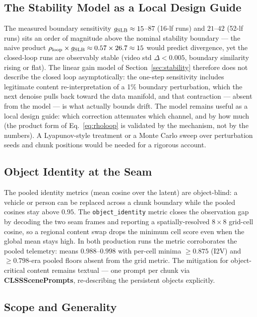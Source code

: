 \documentclass[12pt]{article}
\begin{document}
\subsection{The Stability Model as a Local Design Guide}
\label{sec:stabdisc}
The measured boundary sensitivity $g_{\rm SLB}\approx15$--$87$ (16-lf
runs) and $21$--$42$ (52-lf runs) sits an order of magnitude above the
nominal stability boundary --- the naive product
$\rho_{\rm loop}\times g_{\rm SLB}\approx0.57\times26.7\approx15$ would
predict divergence, yet the closed-loop runs are observably stable (video
std $\Delta<0.005$, boundary similarity rising or flat).  The linear gain
model of Section~\ref{sec:stability} therefore does not describe the closed
loop asymptotically: the one-step sensitivity includes legitimate content
re-interpretation of a 1\% boundary perturbation, which the next denoise
pulls back toward the data manifold, and that contraction --- absent from
the model --- is what actually bounds drift.  The model remains useful as a
local design guide: which correction attenuates which channel, and by how
much (the product form of Eq.~\eqref{eq:rholoop} is validated by the
mechanism, not by the numbers).  A Lyapunov-style treatment or a Monte Carlo
sweep over perturbation seeds and chunk positions would be needed for a
rigorous account.

\subsection{Object Identity at the Seam}
The pooled identity metrics (mean cosine over the latent) are object-blind: a
vehicle or person can be replaced across a chunk boundary while the pooled
cosines stay above $0.95$.  The \texttt{object\_identity} metric closes the
observation gap by decoding the two seam frames and reporting a
spatially-resolved $8\times8$ grid-cell cosine, so a regional content swap
drops the minimum cell score even when the global mean stays high.  In both
production runs the metric corroborates the pooled telemetry: means
$0.988$--$0.998$ with per-cell minima $\ge0.875$ (I2V) and $\ge0.798$-era
pooled floors absent from the grid metric.  The mitigation for
object-critical content remains textual --- one prompt per chunk via
\textbf{CLSSScenePrompts}, re-describing the persistent objects explicitly.

\subsection{Scope and Generality}
\label{sec:scope}
\end{document}
